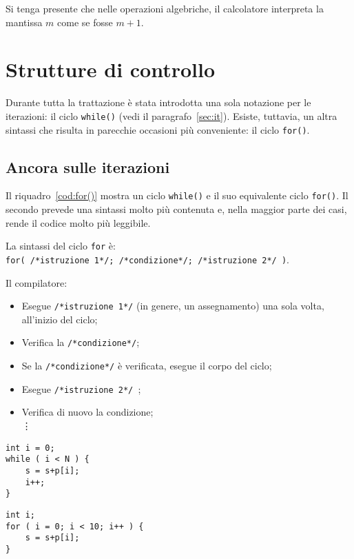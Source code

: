 Si tenga presente che nelle operazioni algebriche, il calcolatore interpreta la mantissa $m$ come se fosse $m+1$.

	\section{Strutture di controllo}
Durante  tutta la trattazione è stata introdotta una sola notazione per le iterazioni: il ciclo \lstinline!while()! (vedi il paragrafo~\vref{sec:it}). Esiste, tuttavia, un altra sintassi che risulta in parecchie occasioni più conveniente: il ciclo \lstinline!for()!.
		\subsection{Ancora sulle iterazioni}
Il riquadro~\vref{cod:for()} mostra un ciclo \lstinline!while()! e il suo equivalente ciclo \lstinline!for()!. Il secondo prevede una sintassi molto più contenuta e, nella maggior parte dei casi, rende il codice molto più leggibile.



La sintassi del ciclo \lstinline!for! è:\\
\lstinline!for( /*istruzione 1*/; /*condizione*/; /*istruzione 2*/ )!.

Il compilatore:
\begin{itemize}
	\item
Esegue \lstinline!/*istruzione 1*/! (in genere, un assegnamento) una sola volta, all'inizio del ciclo;
	\item
Verifica la \lstinline!/*condizione*/!;
	\item
Se la \lstinline!/*condizione*/! è verificata, esegue il corpo del ciclo;
	\item
Esegue \lstinline!/*istruzione 2*/ !;
	\item
Verifica di nuovo la condizione; \\\vdots
\end{itemize}

\begin{code}
\centering
	\caption{Confronto tra il ciclo \lstinline!while()! ed il ciclo \lstinline!for()!.}
	\label{cod:for()}
\begin{minipage}{0.45\columnwidth}
	\begin{lstlisting}
int i = 0;
while ( i < N ) {
	s = s+p[i];
	i++;
}
	\end{lstlisting}
\end{minipage}	\hfill
\begin{minipage}{0.45\columnwidth}
	\begin{lstlisting}
int i;
for ( i = 0; i < 10; i++ ) {
	s = s+p[i];
}
	\end{lstlisting}
\end{minipage}
\end{code}